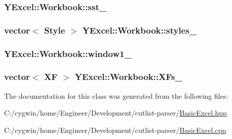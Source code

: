 \subsubsection[{sst\+\_\+}]{ Y\+Excel\+::\+Workbook\+::sst\+\_\+}\label{class_y_excel_1_1_workbook_a5fd3f2b036672d6ef9d8208cc790a3c3}
\hypertarget{class_y_excel_1_1_workbook_af1aa9822f42bb0b71a32e21a1f321ef9}{}
\subsubsection[{styles\+\_\+}]{\setlength{\rightskip}{0pt plus 5cm}vector$<$ {\bf Style} $>$ Y\+Excel\+::\+Workbook\+::styles\+\_\+}\label{class_y_excel_1_1_workbook_af1aa9822f42bb0b71a32e21a1f321ef9}
\hypertarget{class_y_excel_1_1_workbook_a55de50376ca094a43a4f7ae4d0a8eef5}{}
\subsubsection[{window1\+\_\+}]{ Y\+Excel\+::\+Workbook\+::window1\+\_\+}\label{class_y_excel_1_1_workbook_a55de50376ca094a43a4f7ae4d0a8eef5}
\hypertarget{class_y_excel_1_1_workbook_a1112ee5c936e7b8ec1bf79e5bf216ff1}{}
\subsubsection[{X\+Fs\+\_\+}]{\setlength{\rightskip}{0pt plus 5cm}vector$<$ {\bf X\+F} $>$ Y\+Excel\+::\+Workbook\+::\+X\+Fs\+\_\+}\label{class_y_excel_1_1_workbook_a1112ee5c936e7b8ec1bf79e5bf216ff1}


The documentation for this class was generated from the following files\+:\begin{DoxyCompactItemize}
\item 
C\+:/cygwin/home/\+Engineer/\+Development/cutlist-\/parser/\hyperlink{_basic_excel_8hpp}{Basic\+Excel.\+hpp}\item 
C\+:/cygwin/home/\+Engineer/\+Development/cutlist-\/parser/\hyperlink{_basic_excel_8cpp}{Basic\+Excel.\+cpp}\end{DoxyCompactItemize}
